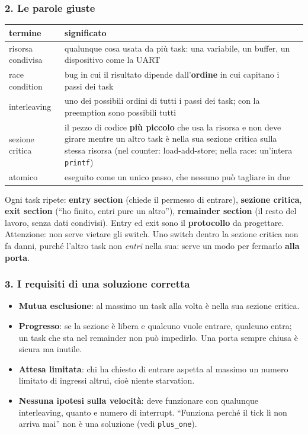 \subsubsection*{2. Le parole giuste}
\begin{center}
\small
\begin{tabular}{P{0.22} P{0.7}}
    \hline
    \textbf{termine} & \textbf{significato} \\
    \hline
    risorsa condivisa & qualunque cosa usata da più task: una variabile, un buffer, un dispositivo come la UART \\
    race condition & bug in cui il risultato dipende dall'\textbf{ordine} in cui capitano i passi dei task \\
    interleaving & uno dei possibili ordini di tutti i passi dei task; con la preemption sono possibili tutti \\
    sezione critica & il pezzo di codice \textbf{più piccolo} che usa la risorsa e non deve girare mentre un altro task è nella sua sezione critica sulla stessa risorsa (nel counter: load-add-store; nella race: un'intera \texttt{printf}) \\
    atomico & eseguito come un unico passo, che nessuno può tagliare in due \\
    \hline
\end{tabular}
\end{center}
Ogni task ripete: \textbf{entry section} (chiede il permesso di entrare), \textbf{sezione critica}, \textbf{exit section} (``ho finito, entri pure un altro''), \textbf{remainder section} (il resto del lavoro, senza dati condivisi). Entry ed exit sono il \textbf{protocollo} da progettare. Attenzione: non serve vietare gli switch. Uno switch dentro la sezione critica non fa danni, purché l'altro task non \emph{entri} nella sua: serve un modo per fermarlo \textbf{alla porta}.

\subsubsection*{3. I requisiti di una soluzione corretta}
\begin{itemize}
    \item \textbf{Mutua esclusione}: al massimo un task alla volta è nella sua sezione critica.
    \item \textbf{Progresso}: se la sezione è libera e qualcuno vuole entrare, qualcuno entra; un task che sta nel remainder non può impedirlo. Una porta sempre chiusa è sicura ma inutile.
    \item \textbf{Attesa limitata}: chi ha chiesto di entrare aspetta al massimo un numero limitato di ingressi altrui, cioè niente starvation.
    \item \textbf{Nessuna ipotesi sulla velocità}: deve funzionare con qualunque interleaving, quanto e numero di interrupt. ``Funziona perché il tick lì non arriva mai'' non è una soluzione (vedi \texttt{plus\_one}).
\end{itemize}

